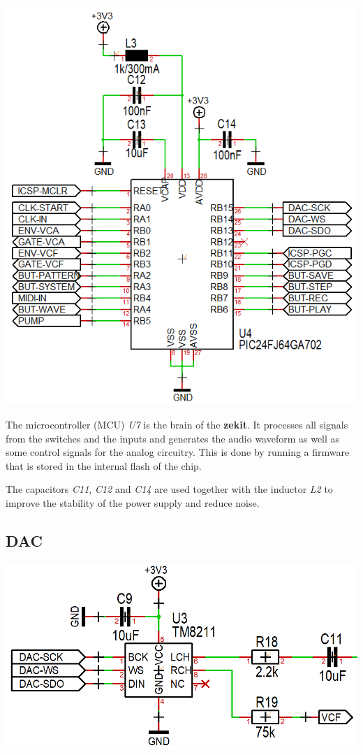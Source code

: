 \documentclass{scrartcl}
\begin{document}
\begin{center}
    \includegraphics[scale=0.55]{assets/schema-mcu.png}
\end{center}

The microcontroller (MCU) \emph{U7} is the brain of the \textbf{zekit}. It processes all signals from the switches and the inputs and generates the audio waveform as well as some control signals for the analog circuitry. This is done by running a firmware that is stored in the internal flash of the chip.

The capacitors \emph{C11}, \emph{C12} and \emph{C14} are used together with the inductor \emph{L2} to improve the stability of the power supply and reduce noise.

\subsection{DAC}

\begin{center}
    \includegraphics[scale=0.30]{assets/schema-dac.png}
\end{center}
\end{document}

